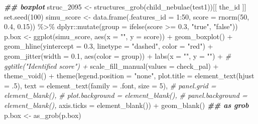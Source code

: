 \documentclass[
]{article}
\newenvironment{Shaded}{\begin{snugshade}}{\end{snugshade}}
\newcommand{\AttributeTok}[1]{\textcolor[rgb]{0.77,0.63,0.00}{#1}}
\newcommand{\CommentTok}[1]{\textcolor[rgb]{0.56,0.35,0.01}{\textit{#1}}}
\newcommand{\DecValTok}[1]{\textcolor[rgb]{0.00,0.00,0.81}{#1}}
\newcommand{\DocumentationTok}[1]{\textcolor[rgb]{0.56,0.35,0.01}{\textbf{\textit{#1}}}}
\newcommand{\FloatTok}[1]{\textcolor[rgb]{0.00,0.00,0.81}{#1}}
\newcommand{\FunctionTok}[1]{\textcolor[rgb]{0.00,0.00,0.00}{#1}}
\newcommand{\NormalTok}[1]{#1}
\newcommand{\OtherTok}[1]{\textcolor[rgb]{0.56,0.35,0.01}{#1}}
\newcommand{\SpecialCharTok}[1]{\textcolor[rgb]{0.00,0.00,0.00}{#1}}
\newcommand{\StringTok}[1]{\textcolor[rgb]{0.31,0.60,0.02}{#1}}
\begin{document}
\begin{Shaded}
\begin{Highlighting}[]
\DocumentationTok{\#\# boxplot}
\NormalTok{struc\_2095 }\OtherTok{\textless{}{-}} \FunctionTok{structures\_grob}\NormalTok{(}\FunctionTok{child\_nebulae}\NormalTok{(test1))[[ the\_id ]]}
\FunctionTok{set.seed}\NormalTok{(}\DecValTok{100}\NormalTok{)}
\NormalTok{simu\_score }\OtherTok{\textless{}{-}} \FunctionTok{data.frame}\NormalTok{(}\AttributeTok{.features\_id =} \DecValTok{1}\SpecialCharTok{:}\DecValTok{50}\NormalTok{, }\AttributeTok{score =} \FunctionTok{rnorm}\NormalTok{(}\DecValTok{50}\NormalTok{, }\FloatTok{0.4}\NormalTok{, }\FloatTok{0.15}\NormalTok{)) }\SpecialCharTok{\%\textgreater{}\%} 
\NormalTok{  dplyr}\SpecialCharTok{::}\FunctionTok{mutate}\NormalTok{(}\AttributeTok{group =} \FunctionTok{ifelse}\NormalTok{(score }\SpecialCharTok{\textgreater{}=} \FloatTok{0.3}\NormalTok{, }\StringTok{"true"}\NormalTok{, }\StringTok{"false"}\NormalTok{))}
\NormalTok{p.box }\OtherTok{\textless{}{-}} \FunctionTok{ggplot}\NormalTok{(simu\_score, }\FunctionTok{aes}\NormalTok{(}\AttributeTok{x =} \StringTok{""}\NormalTok{, }\AttributeTok{y =}\NormalTok{ score)) }\SpecialCharTok{+}
  \FunctionTok{geom\_boxplot}\NormalTok{() }\SpecialCharTok{+}
  \FunctionTok{geom\_hline}\NormalTok{(}\AttributeTok{yintercept =} \FloatTok{0.3}\NormalTok{, }\AttributeTok{linetype =} \StringTok{"dashed"}\NormalTok{, }\AttributeTok{color =} \StringTok{"red"}\NormalTok{) }\SpecialCharTok{+}
  \FunctionTok{geom\_jitter}\NormalTok{(}\AttributeTok{width =} \FloatTok{0.1}\NormalTok{, }\FunctionTok{aes}\NormalTok{(}\AttributeTok{color =}\NormalTok{ group)) }\SpecialCharTok{+}
  \FunctionTok{labs}\NormalTok{(}\AttributeTok{x =} \StringTok{""}\NormalTok{, }\AttributeTok{y =} \StringTok{""}\NormalTok{) }\SpecialCharTok{+}
  \CommentTok{\# ggtitle("Identified score") +}
  \FunctionTok{scale\_fill\_manual}\NormalTok{(}\AttributeTok{values =}\NormalTok{ check\_pal) }\SpecialCharTok{+}
  \FunctionTok{theme\_void}\NormalTok{() }\SpecialCharTok{+}
  \FunctionTok{theme}\NormalTok{(}\AttributeTok{legend.position =} \StringTok{"none"}\NormalTok{,}
    \AttributeTok{plot.title =} \FunctionTok{element\_text}\NormalTok{(}\AttributeTok{hjust =}\NormalTok{ .}\DecValTok{5}\NormalTok{),}
    \AttributeTok{text =} \FunctionTok{element\_text}\NormalTok{(}\AttributeTok{family =}\NormalTok{ .font, }\AttributeTok{size =} \DecValTok{5}\NormalTok{),}
    \CommentTok{\# panel.grid = element\_blank(),}
    \CommentTok{\# plot.background = element\_blank(),}
    \CommentTok{\# panel.background = element\_blank(),}
    \AttributeTok{axis.ticks =} \FunctionTok{element\_blank}\NormalTok{()) }\SpecialCharTok{+}
  \FunctionTok{geom\_blank}\NormalTok{()}
\DocumentationTok{\#\# as grob}
\NormalTok{p.box }\OtherTok{\textless{}{-}} \FunctionTok{as\_grob}\NormalTok{(p.box)}


\end{Highlighting}
\end{Shaded}
\end{document}
